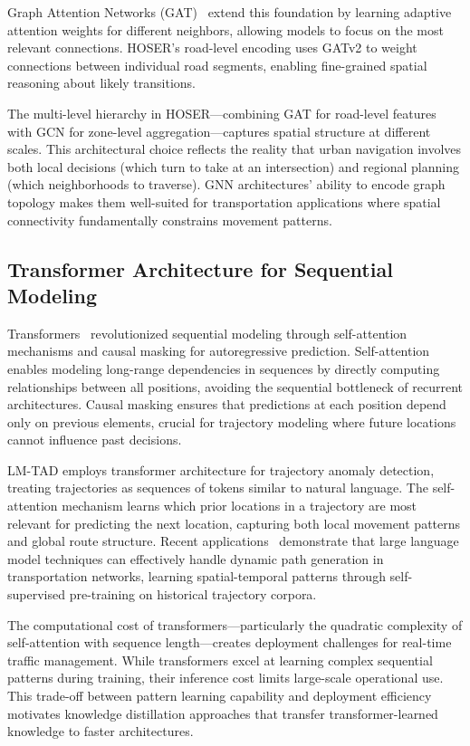 Graph Attention Networks (GAT)~\cite{velickovicGraphAttentionNetworks2018} extend this foundation by learning adaptive attention weights for different neighbors, allowing models to focus on the most relevant connections. HOSER's road-level encoding uses GATv2 to weight connections between individual road segments, enabling fine-grained spatial reasoning about likely transitions.

The multi-level hierarchy in HOSER—combining GAT for road-level features with GCN for zone-level aggregation—captures spatial structure at different scales. This architectural choice reflects the reality that urban navigation involves both local decisions (which turn to take at an intersection) and regional planning (which neighborhoods to traverse). GNN architectures' ability to encode graph topology makes them well-suited for transportation applications where spatial connectivity fundamentally constrains movement patterns.

\subsection{Transformer Architecture for Sequential Modeling}
\label{sec:lit-transformer}

Transformers~\cite{vaswaniAttentionAllYou2017} revolutionized sequential modeling through self-attention mechanisms and causal masking for autoregressive prediction. Self-attention enables modeling long-range dependencies in sequences by directly computing relationships between all positions, avoiding the sequential bottleneck of recurrent architectures. Causal masking ensures that predictions at each position depend only on previous elements, crucial for trajectory modeling where future locations cannot influence past decisions.

LM-TAD employs transformer architecture for trajectory anomaly detection, treating trajectories as sequences of tokens similar to natural language. The self-attention mechanism learns which prior locations in a trajectory are most relevant for predicting the next location, capturing both local movement patterns and global route structure. Recent applications~\cite{liPathGenLLMLargeLanguage} demonstrate that large language model techniques can effectively handle dynamic path generation in transportation networks, learning spatial-temporal patterns through self-supervised pre-training on historical trajectory corpora.

The computational cost of transformers—particularly the quadratic complexity of self-attention with sequence length—creates deployment challenges for real-time traffic management. While transformers excel at learning complex sequential patterns during training, their inference cost limits large-scale operational use. This trade-off between pattern learning capability and deployment efficiency motivates knowledge distillation approaches that transfer transformer-learned knowledge to faster architectures.


